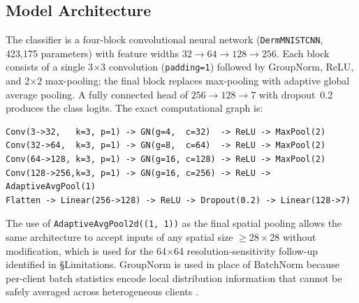 \documentclass[11pt,a4paper]{article}
\begin{document}
\subsection{Model Architecture}\label{sec:model}
The classifier is a four-block convolutional neural network
(\texttt{DermMNISTCNN}, 423{,}175 parameters) with feature widths
$32 \to 64 \to 128 \to 256$. Each block consists of a single
3$\times$3 convolution (\texttt{padding=1}) followed by GroupNorm, ReLU,
and 2$\times$2 max-pooling; the final block replaces max-pooling with
adaptive global average pooling. A fully connected head of
$256 \to 128 \to 7$ with dropout~0.2 produces the class logits. The
exact computational graph is:
\begin{verbatim}
Conv(3->32,   k=3, p=1) -> GN(g=4,  c=32)  -> ReLU -> MaxPool(2)
Conv(32->64,  k=3, p=1) -> GN(g=8,  c=64)  -> ReLU -> MaxPool(2)
Conv(64->128, k=3, p=1) -> GN(g=16, c=128) -> ReLU -> MaxPool(2)
Conv(128->256,k=3, p=1) -> GN(g=16, c=256) -> ReLU -> AdaptiveAvgPool(1)
Flatten -> Linear(256->128) -> ReLU -> Dropout(0.2) -> Linear(128->7)
\end{verbatim}
The use of \texttt{AdaptiveAvgPool2d((1, 1))} as the final spatial
pooling allows the same architecture to accept inputs of any spatial
size $\geq 28 \times 28$ without modification, which is used for the
64$\times$64 resolution-sensitivity follow-up identified in §Limitations.
GroupNorm \citep{wu2018groupnorm} is used in place of BatchNorm because
per-client batch statistics encode local distribution information that
cannot be safely averaged across heterogeneous clients
\citep{hsieh2020quagmire}.
\end{document}
